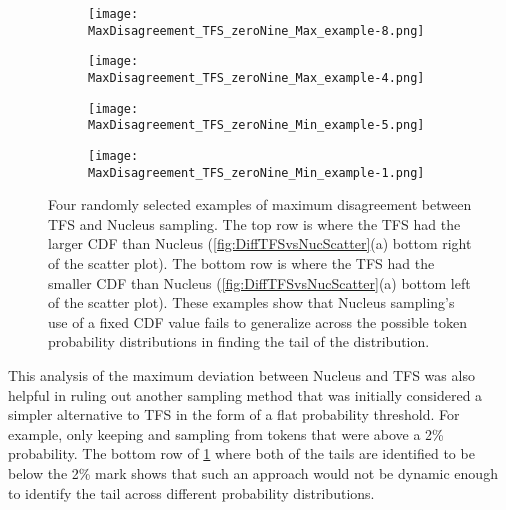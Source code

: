 \documentclass{article}
\begin{document}
\begin{figure}[h]
  \begin{subfigure}{.5\textwidth}
    \centering
    \texttt{[image: MaxDisagreement\_TFS\_zeroNine\_Max\_example-8.png]}
  \end{subfigure}
  \hfill
  \begin{subfigure}{.5\textwidth}
    \centering
    \texttt{[image: MaxDisagreement\_TFS\_zeroNine\_Max\_example-4.png]}
  \end{subfigure}

  \medskip

  \begin{subfigure}[t]{0.5\textwidth}
    \centering
    \texttt{[image: MaxDisagreement\_TFS\_zeroNine\_Min\_example-5.png]}
  \end{subfigure}
  \hfill
  \begin{subfigure}[t]{0.5\textwidth}
    \centering
    \texttt{[image: MaxDisagreement\_TFS\_zeroNine\_Min\_example-1.png]}
  \end{subfigure}
  \caption{Four randomly selected examples of maximum disagreement between TFS and Nucleus sampling. The top row is where the TFS had the larger CDF than Nucleus (\ref{fig:DiffTFSvsNucScatter}(a) bottom right of the scatter plot). The bottom row is where the TFS had the smaller CDF than Nucleus (\ref{fig:DiffTFSvsNucScatter}(a) bottom left of the scatter plot). These examples show that Nucleus sampling's use of a fixed CDF value fails to generalize across the possible token probability distributions in finding the tail of the distribution.}
  \label{fig:MaxDisagree}
\end{figure}

This analysis of the maximum deviation between Nucleus and TFS was also helpful in ruling out another sampling method that was initially considered a simpler alternative to TFS in the form of a flat probability threshold. For example, only keeping and sampling from tokens that were above a 2\% probability. The bottom row of \ref{fig:MaxDisagree} where both of the tails are identified to be below the 2\% mark shows that such an approach would not be dynamic enough to identify the tail across different probability distributions. 
\end{document}
